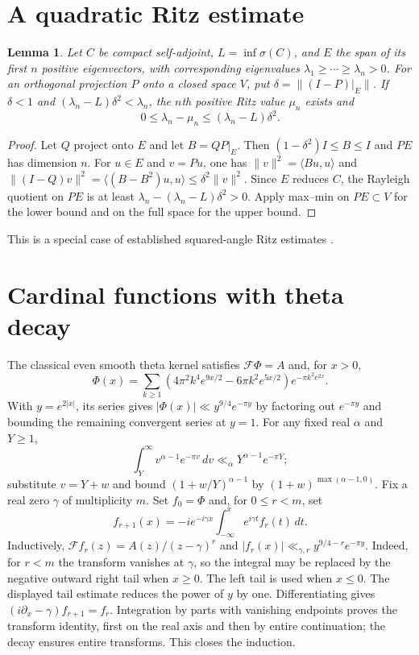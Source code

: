 \documentclass[11pt]{article}
\newtheorem{lemma}{Lemma}
\newcommand{\F}{\mathcal F}
\newcommand{\norm}[1]{\lVert#1\rVert}
\begin{document}
\section{A quadratic Ritz estimate}
\begin{lemma}
Let $C$ be compact self-adjoint, $L=\inf\sigma(C)$, and $E$ the span of its first $n$ positive eigenvectors, with corresponding eigenvalues $\lambda_1\ge\cdots\ge\lambda_n>0$. For an orthogonal projection $P$ onto a closed space $V$, put $\delta=\norm{(I-P)|_E}$. If $\delta<1$ and $(\lambda_n-L)\delta^2<\lambda_n$, the $n$th positive Ritz value $\mu_n$ exists and
\[
0\le\lambda_n-\mu_n\le(\lambda_n-L)\delta^2.
\]
\end{lemma}
\begin{proof}
Let $Q$ project onto $E$ and let $B=QP|_E$. Then $(1-\delta^2)I\le B\le I$ and $PE$ has dimension $n$. For $u\in E$ and $v=Pu$, one has $\norm{v}^2=\langle Bu,u\rangle$ and $\norm{(I-Q)v}^2=\langle(B-B^2)u,u\rangle\le\delta^2\norm{v}^2$. Since $E$ reduces $C$, the Rayleigh quotient on $PE$ is at least $\lambda_n-(\lambda_n-L)\delta^2>0$. Apply max--min on $PE\subset V$ for the lower bound and on the full space for the upper bound.
\end{proof}
This is a special case of established squared-angle Ritz estimates \cite{ritz}.
\section{Cardinal functions with theta decay}
The classical even smooth theta kernel \cite[Eqs.~(1.1)--(1.2), Lemma~3.1]{theta} satisfies $\F\Phi=A$ and, for $x>0$,
\[
\Phi(x)=\sum_{k\ge1}(4\pi^2k^4e^{9x/2}-6\pi k^2e^{5x/2})e^{-\pi k^2e^{2x}}.
\]
With $y=e^{2|x|}$, its series gives $|\Phi(x)|\ll y^{9/4}e^{-\pi y}$ by factoring out $e^{-\pi y}$ and bounding the remaining convergent series at $y=1$. For any fixed real $\alpha$ and $Y\ge1$,
\[
\int_Y^\infty v^{\alpha-1}e^{-\pi v}\,dv\ll_\alpha Y^{\alpha-1}e^{-\pi Y};
\]
substitute $v=Y+w$ and bound $(1+w/Y)^{\alpha-1}$ by $(1+w)^{\max(\alpha-1,0)}$.
Fix a real zero $\gamma$ of multiplicity $m$. Set $f_0=\Phi$ and, for $0\le r<m$, set
\[
f_{r+1}(x)=-i e^{-i\gamma x}\int_{-\infty}^x e^{i\gamma t}f_r(t)\,dt.
\]
Inductively, $\F f_r(z)=A(z)/(z-\gamma)^r$ and $|f_r(x)|\ll_{\gamma,r}y^{9/4-r}e^{-\pi y}$. Indeed, for $r<m$ the transform vanishes at $\gamma$, so the integral may be replaced by the negative outward right tail when $x\ge0$. The left tail is used when $x\le0$. The displayed tail estimate reduces the power of $y$ by one. Differentiating gives $(i\partial_x-\gamma)f_{r+1}=f_r$. Integration by parts with vanishing endpoints proves the transform identity, first on the real axis and then by entire continuation; the decay ensures entire transforms. This closes the induction.
\end{document}
